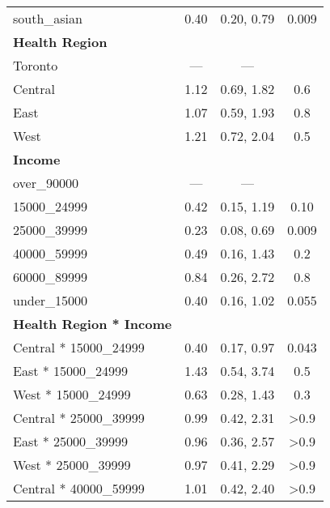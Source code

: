 \documentclass[
  letterpaper,
  DIV=11,
  numbers=noendperiod]{scrartcl}
\begin{document}
\begin{longtable}{lccc}
\hspace{1em}south\_asian & 0.40 & 0.20, 0.79 & 0.009\\
\textbf{Health Region} &  &  & \\
\hspace{1em}Toronto & — & — & \\
\hspace{1em}Central & 1.12 & 0.69, 1.82 & 0.6\\
\addlinespace
\hspace{1em}East & 1.07 & 0.59, 1.93 & 0.8\\
\hspace{1em}West & 1.21 & 0.72, 2.04 & 0.5\\
\textbf{Income} &  &  & \\
\hspace{1em}over\_90000 & — & — & \\
\hspace{1em}15000\_24999 & 0.42 & 0.15, 1.19 & 0.10\\
\addlinespace
\hspace{1em}25000\_39999 & 0.23 & 0.08, 0.69 & 0.009\\
\hspace{1em}40000\_59999 & 0.49 & 0.16, 1.43 & 0.2\\
\hspace{1em}60000\_89999 & 0.84 & 0.26, 2.72 & 0.8\\
\hspace{1em}under\_15000 & 0.40 & 0.16, 1.02 & 0.055\\
\textbf{Health Region * Income} &  &  & \\
\addlinespace
\hspace{1em}Central * 15000\_24999 & 0.40 & 0.17, 0.97 & 0.043\\
\hspace{1em}East * 15000\_24999 & 1.43 & 0.54, 3.74 & 0.5\\
\hspace{1em}West * 15000\_24999 & 0.63 & 0.28, 1.43 & 0.3\\
\hspace{1em}Central * 25000\_39999 & 0.99 & 0.42, 2.31 & >0.9\\
\hspace{1em}East * 25000\_39999 & 0.96 & 0.36, 2.57 & >0.9\\
\addlinespace
\hspace{1em}West * 25000\_39999 & 0.97 & 0.41, 2.29 & >0.9\\
\hspace{1em}Central * 40000\_59999 & 1.01 & 0.42, 2.40 & >0.9\\

\end{longtable}
\end{document}
